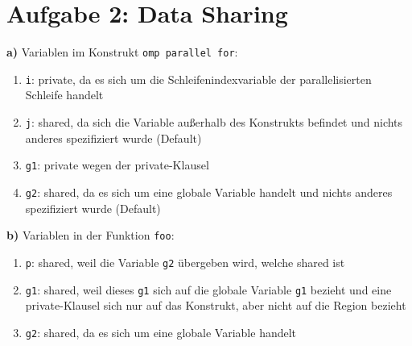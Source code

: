 \chapter{Aufgabe 2: Data Sharing}

\textbf{a)} Variablen im Konstrukt \texttt{omp parallel for}:
\begin{enumerate}
 \item \texttt{i}: private, da es sich um die Schleifenindexvariable der parallelisierten Schleife handelt
 \item \texttt{j}: shared, da sich die Variable außerhalb des Konstrukts befindet und nichts anderes spezifiziert wurde (Default)
 \item \texttt{g1}: private wegen der private-Klausel 
 \item \texttt{g2}: shared, da es sich um eine globale Variable handelt und nichts anderes spezifiziert wurde (Default)
\end{enumerate}

\noindent\textbf{b)} Variablen in der Funktion \texttt{foo}:
\begin{enumerate}
 \item \texttt{p}: shared, weil die Variable \texttt{g2} übergeben wird, welche shared ist 
 \item \texttt{g1}: shared, weil dieses \texttt{g1} sich auf die globale Variable \texttt{g1} bezieht und eine private-Klausel sich nur auf das Konstrukt, aber nicht auf die Region bezieht 
 \item \texttt{g2}: shared, da es sich um eine globale Variable handelt
\end{enumerate}
